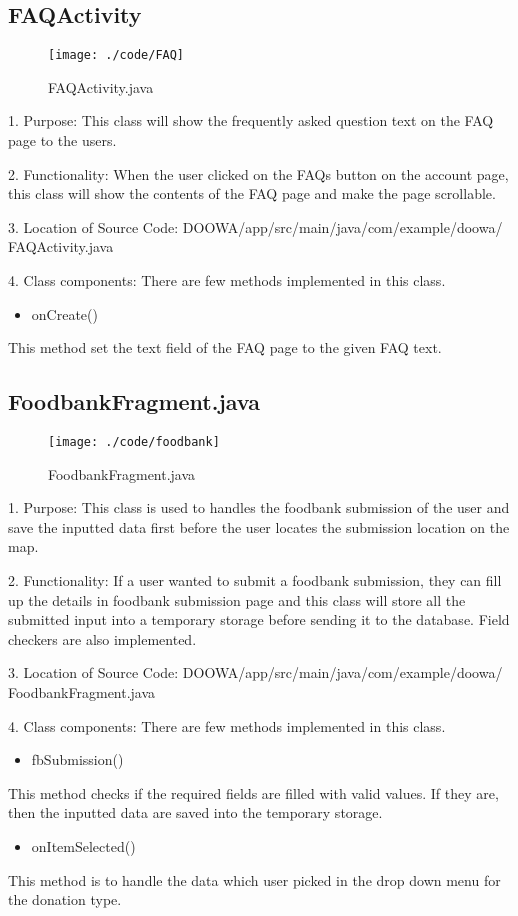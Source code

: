 \documentclass[conference]{IEEEtran}
\begin{document}
\subsection{FAQActivity}
\begin{figure}[h!]
\texttt{[image: ./code/FAQ]}
\centering
\caption{FAQActivity.java}
\end{figure}
1. Purpose: This class will show the frequently asked question text on the FAQ page to the users.\break
\par 2. Functionality: When the user clicked on the FAQs button on the account page, this class will show the contents of the FAQ page and make the page scrollable.\break

3. Location of Source Code: DOOWA/app/src/main/java/com/example/doowa/ FAQActivity.java\break

4. Class components: There are few methods implemented in this class.
\begin{itemize}
\item onCreate()
\end{itemize}
This method set the text field of the FAQ page to the given FAQ text.
\break

\subsection{FoodbankFragment.java}
\begin{figure}[h!]
\texttt{[image: ./code/foodbank]}
\centering
\caption{FoodbankFragment.java}
\end{figure}
1. Purpose: This class is used to handles the foodbank submission of the user and save the inputted data first before the user locates the submission location on the map.\break
\par 2. Functionality: If a user wanted to submit a foodbank submission, they can fill up the details in foodbank submission page and this class will store all the submitted input into a temporary storage before sending it to the database. Field checkers are also implemented.\break

3. Location of Source Code: DOOWA/app/src/main/java/com/example/doowa/ FoodbankFragment.java\break

4. Class components: There are few methods implemented in this class.
\begin{itemize}
\item fbSubmission()
\end{itemize}
This method checks if the required fields are filled with valid values. If they are, then the inputted data are saved into the temporary storage. 
\begin{itemize}
\item onItemSelected()
\end{itemize}
This method is to handle the data which user picked in the drop down menu for the donation type.
\break
\end{document}
